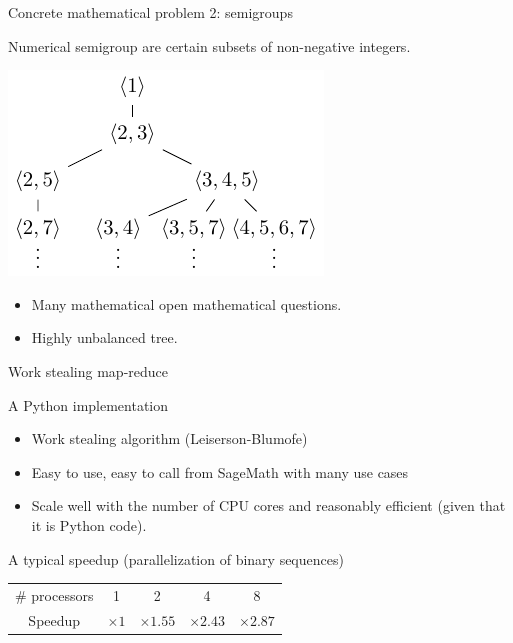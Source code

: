 \documentclass{beamer}
\begin{document}
\begin{frame}{Concrete mathematical problem 2: semigroups}
  \begin{example}
  Numerical semigroup are certain subsets of non-negative integers.
  \begin{center}%
  \includegraphics{Pictures/semigroups.pdf}%
  \end{center}%
  \end{example}

  \begin{itemize}
  \item Many mathematical open mathematical questions.
  \item Highly unbalanced tree.
  \end{itemize}
\end{frame}
\begin{frame}{Work stealing map-reduce}

  \begin{block}{A Python implementation}
    \begin{itemize}
    \item Work stealing algorithm (Leiserson-Blumofe)
    \item Easy to use, easy to call from SageMath with many use cases
    \item Scale well with the number of CPU cores and reasonably efficient (given that it is Python code).
    \end{itemize}
  \end{block}

  A typical speedup (parallelization of binary sequences)
  \begin{center}\begin{tabular}{c|cccc}
    \# processors & 1 & 2 & 4 & 8\\
     Speedup      & $\times 1$ & $\times 1.55$ & $\times 2.43$ & $\times 2.87$
  \end{tabular}\end{center}
 
\end{frame}
\end{document}
